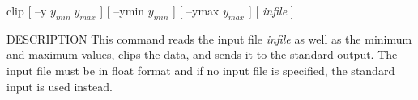 % 
% 
% 
% 
%                                                                        
%

\begin{synopsis}
\item[clip] [ --y $y_{min} \; y_{max}$ ] [ --ymin $y_{min}$ ] [ --ymax $y_{max}$ ] [ {\em infile} ]
\end{synopsis}

\begin{qsection}{DESCRIPTION}
This command reads the input file {\em infile}
as well as the minimum and maximum values,
clips the data, and sends it to the standard output.
The input file must be in float format
and if no input file is specified, the standard input is used instead.
\end{qsection}

